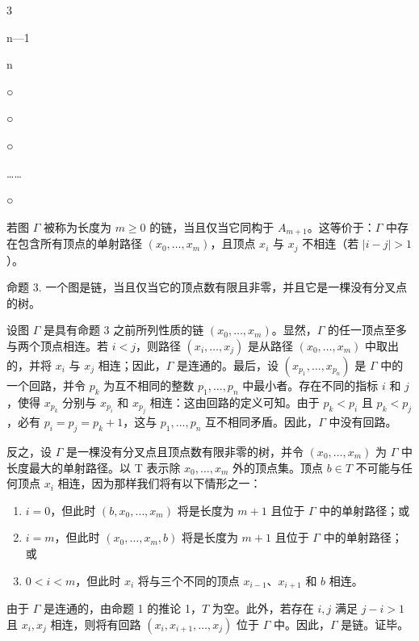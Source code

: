 3

n---1

n

○

○

○

\ldots\ldots{}

○

若图 \(\Gamma\) 被称为长度为 \(m \geqslant 0\) 的链，当且仅当它同构于 \(A_{m+1}\)。这等价于：\(\Gamma\) 中存在包含所有顶点的单射路径 \((x_{0}, \ldots, x_{m})\)，且顶点 \(x_{i}\) 与 \(x_{j}\) 不相连（若 \(|i-j| > 1\)）。

命题 3. 一个图是链，当且仅当它的顶点数有限且非零，并且它是一棵没有分叉点的树。

设图 \(\Gamma\) 是具有命题 3 之前所列性质的链 \((x_0, \ldots, x_m)\)。显然，\(\Gamma\) 的任一顶点至多与两个顶点相连。若 \(i < j\)，则路径 \((x_i, \ldots, x_j)\) 是从路径 \((x_0, \ldots, x_m)\) 中取出的，并将 \(x_i\) 与 \(x_j\) 相连；因此，\(\Gamma\) 是连通的。最后，设 \((x_{p_1}, \ldots, x_{p_n})\) 是 \(\Gamma\) 中的一个回路，并令 \(p_k\) 为互不相同的整数 \(p_1, \ldots, p_n\) 中最小者。存在不同的指标 \(i\) 和 \(j\)，使得 \(x_{p_k}\) 分别与 \(x_{p_i}\) 和 \(x_{p_j}\) 相连：这由回路的定义可知。由于 \(p_k < p_i\) 且 \(p_k < p_j\)，必有 \(p_i = p_j = p_k + 1\)，这与 \(p_1, \ldots, p_n\) 互不相同矛盾。因此，\(\Gamma\) 中没有回路。

反之，设 \(\Gamma\) 是一棵没有分叉点且顶点数有限非零的树，并令 \((x_0, \ldots, x_m)\) 为 \(\Gamma\) 中长度最大的单射路径。以 T 表示除 \(x_0, \ldots, x_m\) 外的顶点集。顶点 \(b \in T\) 不可能与任何顶点 \(x_i\) 相连，因为那样我们将有以下情形之一：

\begin{enumerate}
\def\labelenumi{\alph{enumi})}
\item
  \(i = 0\)，但此时 \((b, x_0, \ldots, x_m)\) 将是长度为 \(m + 1\) 且位于 \(\Gamma\) 中的单射路径；或
\item
  \(i = m\)，但此时 \((x_0, \ldots, x_m, b)\) 将是长度为 \(m + 1\) 且位于 \(\Gamma\) 中的单射路径；或
\item
  \(0 < i < m\)，但此时 \(x_{i}\) 将与三个不同的顶点 \(x_{i-1}\)、\(x_{i+1}\) 和 \(b\) 相连。
\end{enumerate}

由于 \(\Gamma\) 是连通的，由命题 1 的推论 1，\(T\) 为空。此外，若存在 \(i,j\) 满足 \(j - i > 1\) 且 \(x_{i}, x_{j}\) 相连，则将有回路 \((x_{i}, x_{i+1}, \ldots, x_{j})\) 位于 \(\Gamma\) 中。因此，\(\Gamma\) 是链。证毕。

